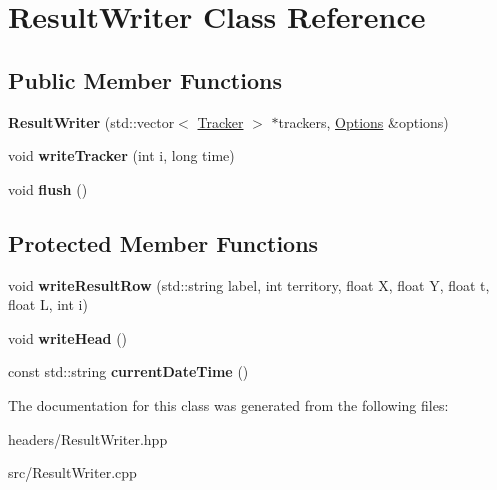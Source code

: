 \hypertarget{classResultWriter}{\section{Result\-Writer Class Reference}
\label{classResultWriter}
}
\subsection*{Public Member Functions}
\begin{DoxyCompactItemize}
\item 
\hypertarget{classResultWriter_ab1750e36a734ea9708e71a11befdabb4}{{\bfseries Result\-Writer} (std\-::vector$<$ \hyperlink{classTracker}{Tracker} $>$ $\ast$trackers, \hyperlink{structOptions}{Options} \&options)}\label{classResultWriter_ab1750e36a734ea9708e71a11befdabb4}

\item 
\hypertarget{classResultWriter_a9127388be236df6f3a5385c88f4b224f}{void {\bfseries write\-Tracker} (int i, long time)}\label{classResultWriter_a9127388be236df6f3a5385c88f4b224f}

\item 
\hypertarget{classResultWriter_a882ed427d65bb2eae759d26698c6a05a}{void {\bfseries flush} ()}\label{classResultWriter_a882ed427d65bb2eae759d26698c6a05a}

\end{DoxyCompactItemize}
\subsection*{Protected Member Functions}
\begin{DoxyCompactItemize}
\item 
\hypertarget{classResultWriter_a18f48292106fb0242241ca7cc8073992}{void {\bfseries write\-Result\-Row} (std\-::string label, int territory, float X, float Y, float t, float L, int i)}\label{classResultWriter_a18f48292106fb0242241ca7cc8073992}

\item 
\hypertarget{classResultWriter_af885f392fefe87bb973f4ddd658464fd}{void {\bfseries write\-Head} ()}\label{classResultWriter_af885f392fefe87bb973f4ddd658464fd}

\item 
\hypertarget{classResultWriter_a6a87d6f102f4be0a27e3a3e09010db31}{const std\-::string {\bfseries current\-Date\-Time} ()}\label{classResultWriter_a6a87d6f102f4be0a27e3a3e09010db31}

\end{DoxyCompactItemize}


The documentation for this class was generated from the following files\-:\begin{DoxyCompactItemize}
\item 
headers/Result\-Writer.\-hpp\item 
src/Result\-Writer.\-cpp\end{DoxyCompactItemize}
